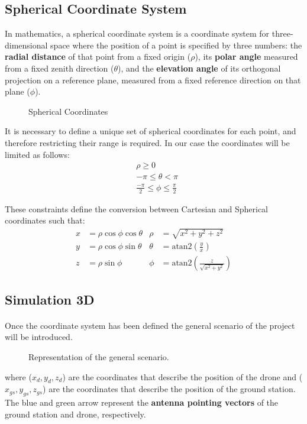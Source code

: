 \subsection*{Spherical Coordinate System}

In mathematics, a spherical coordinate system is a coordinate system for three-dimensional space where the position of a point is specified by three numbers: the \textbf{radial distance} of that point from a fixed origin ($\rho$), its \textbf{polar angle} measured from a fixed zenith direction ($\theta$), and the \textbf{elevation angle} of its orthogonal projection on a reference plane, measured from a fixed reference direction on that plane ($\phi$).

\begin{figure}[H]
   \centering
     
    \label{fig:Spherical1}
    \caption{Spherical Coordinates}
\end{figure}

 It is necessary to define a unique set of spherical coordinates for each point, and therefore restricting their range is required. In our case the coordinates will be limited as follows:
\begin{align*}
& \rho \geq 0 \\
& -\pi \leq \theta < \pi \\
& \frac{-\pi}{2} \leq \phi \leq \frac{\pi}{2}
\label{eq:los_distToHorizon}
\end{align*} 

These constraints define the conversion between Cartesian and Spherical coordinates such that:
\begin{align*}
x &=  \rho\cos\phi\cos\theta	&	\rho &= \sqrt{x^{2} + y^{2} + z^{2}} \\
y &= \rho\cos\phi\sin\theta		&	\theta &= \text{atan2}\left(\frac{y}{x}\right)\\
z &= \rho\sin\phi				&	\phi &=  \text{atan2}\left(\frac{z}{\sqrt{x^2 + y^2}}\right)
\label{eq:los_distToHorizon}
\end{align*} 

\subsection*{Simulation 3D}
\paragraph{} Once the coordinate system has been defined the general scenario of the project will be introduced.
\begin{figure}[H]
   \centering
     
    \label{fig:Scenario1}
    \caption{Representation of the general scenario.}
\end{figure}
where ($x_d,y_d,z_d$) are the coordinates that describe the position of the drone and ($x_{gs},y_{gs},z_{gs}$) are the coordinates that describe the position of the ground station.
The blue and green arrow represent the \textbf{antenna pointing vectors} of the ground station and drone, respectively.

